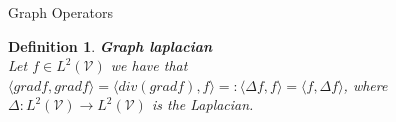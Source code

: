 \documentclass{article}
\newtheorem{defn}{Definition}[section]
\newcommand{\bb}[1]{\textbf{#1}}
\newcommand{\scal}[2]{\langle #1 , #2 \rangle}
\newcommand{\mc}{\mathcal}
\begin{document}
\begin{section}{Graph Operators}
        \begin{defn}
	    \bb{Graph laplacian}\\
	    Let $f \in L^2(\mc{V})$ we have that $\scal{gradf}{gradf}=\scal{div(gradf)}{f} =: \scal{\Delta f}{f} = \scal{f}{\Delta f}$, where\\
	    $\Delta : L^2(\mc{V}) \to L^2(\mc{V})$ is the Laplacian.
	\end{defn}
    
    \end{section}
\end{document}
